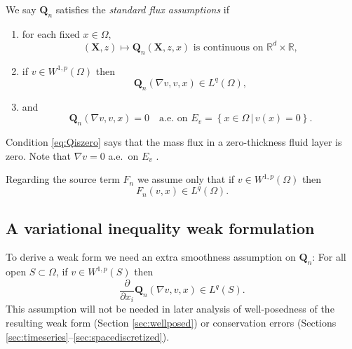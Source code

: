 \documentclass[final,onefignum]{siamart190516}
\newcommand\bQ{\mathbf{Q}}
\newcommand\bX{\mathbf{X}}
\newcommand{\grad}{\nabla}
\newcommand\RR{\mathbb{R}}
\begin{document}
\begin{definition}  \label{ass:std}  We say $\bQ_n$ satisfies the \emph{standard flux assumptions} if
\renewcommand{\labelenumi}{\emph{\roman{enumi}})}
\begin{enumerate}
\item for each fixed $x\in \Omega$,
\begin{equation}
(\bX,z) \mapsto \bQ_n(\bX,z,x) \text{ is continuous on } \RR^d \times \RR,  \label{eq:Qiscontinuous}
\end{equation}
\item if $v \in W^{1,p}(\Omega)$ then
\begin{equation}
\bQ_n(\grad v,v,x) \in L^q(\Omega), \label{eq:QisLq}
\end{equation}
\item and
\begin{equation}
\bQ_n(\grad v,v,x)=0 \quad \text{a.e.~on } E_v = \left\{x\in\Omega\,\big|\,v(x)=0\right\}. \label{eq:Qiszero}
\end{equation}
\end{enumerate}
\end{definition}
Condition \eqref{eq:Qiszero} says that the mass flux in a zero-thickness fluid layer is zero.  Note that $\grad v = 0$ a.e.~on $E_v$ \cite[lemma A.4 in chapter II]{KinderlehrerStampacchia1980}.

Regarding the source term $F_n$ we assume only that if $v\in W^{1,p}(\Omega)$ then
\begin{equation}
F_n(v,x) \in L^q(\Omega).  \label{eq:FisLq}
\end{equation}

\subsection{A variational inequality weak formulation}  \label{subsec:derivevi}  To derive a weak form we need an extra smoothness assumption on $\bQ_n$:  For all open $S \subset \Omega$, if $v\in W^{1,p}(S)$ then
\begin{equation}
\frac{\partial}{\partial x_i} \bQ_n(\grad v,v,x) \in L^q(S). \label{eq:Qissmooth}
\end{equation}
This assumption will not be needed in later analysis of well-posedness of the resulting weak form (Section \ref{sec:wellposed}) or conservation errors (Sections \ref{sec:timeseries}--\ref{sec:spacediscretized}).
\end{document}
